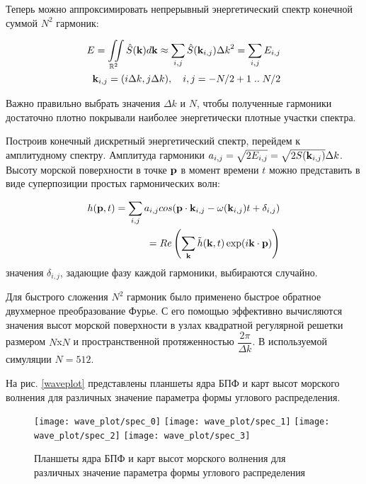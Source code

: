 Теперь можно аппроксимировать непрерывный энергетический спектр конечной суммой $N^2$ гармоник:

\begin{equation}
\begin{split}
E = \iint\limits_{\mathbb{R}^2} \hat{S}(\mathbf{k})d\mathbf{k}
    \approx \sum_{i,j} \hat{S}(\mathbf{k}_{i,j}) {\Delta k}^2 
    = \sum_{i,j} E_{i,j}\\
\mathbf{k}_{i,j} = (i\Delta k, j\Delta k), \quad i,j = -N/2+1 \; .. \; N/2 
\end{split}
\end{equation}

Важно правильно выбрать значения $\Delta k$ и $N$, чтобы полученные гармоники достаточно плотно покрывали наиболее энергетически плотные участки спектра.

Построив конечный дискретный энергетический спектр, перейдем к амплитудному спектру. Амплитуда гармоники $a_{i,j} = \sqrt{2E_{i,j}} = \sqrt{2S(\mathbf{k}_{i,j})}\Delta k$. Высоту морской поверхности в точке $\mathbf{p}$ в момент времени $t$ можно представить в виде суперпозиции простых гармонических волн:

\begin{equation}
\label{wave_height}
\begin{split}
h(\mathbf{p}, t) = \sum_{i,j} a_{i,j}cos(\mathbf{p}\cdot \mathbf{k}_{i,j} - \omega(\mathbf{k}_{i,j})t + \delta_{i,j}) \\
= Re\left( \sum_{\mathbf{k}} \tilde{h}(\mathbf{k}, t)
 \exp(i\mathbf{k} \cdot \mathbf{p}) \right)
\end{split}
\end{equation}
значения $\delta_{i,j}$, задающие фазу каждой гармоники, выбираются случайно.

Для быстрого сложения $N^2$ гармоник было применено быстрое обратное двухмерное преобразование Фурье. С его помощью эффективно вычисляются значения высот морской поверхности в узлах квадратной регулярной решетки размером $N$x$N$ и пространственной протяженностью $\dfrac{2\pi}{\Delta k}$. В используемой симуляции $N = 512$.

На рис. \ref{waveplot} представлены планшеты ядра БПФ и карт высот морского волнения для различных значение параметра формы углового распределения.

\begin{figure}[ht]
\begin{center}
	\texttt{[image: wave\_plot/spec\_0]}
	\texttt{[image: wave\_plot/spec\_1]}
	\texttt{[image: wave\_plot/spec\_2]}
	\texttt{[image: wave\_plot/spec\_3]}
\end{center}
\caption{Планшеты ядра БПФ и карт высот морского волнения для различных значение параметра формы углового распределения}
\label{spectrums}
\end{figure}

